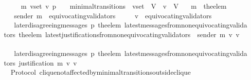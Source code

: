 \begin{isabellebody}
\ \ {\isachardoublequoteopen}{\isasymforall}\ {\isasymsigma}\ {\isasymsigma}{\isacharprime}\ m{\isacharprime}\ v{\isacharunderscore}set\ v\ p{\isachardot}\ {\isacharparenleft}{\isasymsigma}{\isacharcomma}\ {\isasymsigma}{\isacharprime}{\isacharparenright}\ {\isasymin}\ minimal{\isacharunderscore}transitions\ {\isasymand}\ v{\isacharunderscore}set\ {\isasymsubseteq}\ V\ {\isasymand}\ v\ {\isasymin}\ V\isanewline
\ \ {\isasymlongrightarrow}\ m{\isacharprime}\ {\isacharequal}\ the{\isacharunderscore}elem\ {\isacharparenleft}{\isasymsigma}{\isacharprime}\ {\isacharminus}\ {\isasymsigma}{\isacharparenright}\isanewline
\ \ {\isasymlongrightarrow}\ sender\ m{\isacharprime}\ {\isasymnotin}\ equivocating{\isacharunderscore}validators\ {\isasymsigma}{\isacharprime}\ \isanewline
\ \ {\isasymlongrightarrow}\ v\ {\isasymnotin}\ equivocating{\isacharunderscore}validators\ {\isasymsigma}\isanewline
\ \ {\isasymlongrightarrow}\ later{\isacharunderscore}disagreeing{\isacharunderscore}messages\ {\isacharparenleft}p{\isacharcomma}\ {\isacharparenleft}the{\isacharunderscore}elem\ {\isacharparenleft}latest{\isacharunderscore}messages{\isacharunderscore}from{\isacharunderscore}non{\isacharunderscore}equivocating{\isacharunderscore}validators\ {\isacharparenleft}the{\isacharunderscore}elem\ {\isacharparenleft}latest{\isacharunderscore}justifications{\isacharunderscore}from{\isacharunderscore}non{\isacharunderscore}equivocating{\isacharunderscore}validators\ {\isasymsigma}\ {\isacharparenleft}sender\ m{\isacharprime}{\isacharparenright}{\isacharparenright}{\isacharparenright}\ v{\isacharparenright}{\isacharparenright}{\isacharcomma}\ v{\isacharcomma}\ {\isasymsigma}{\isacharparenright}\ {\isacharequal}\ {\isasymemptyset}\isanewline
\ \ {\isasymlongrightarrow}\ later{\isacharunderscore}disagreeing{\isacharunderscore}messages\ {\isacharparenleft}p{\isacharcomma}\ {\isacharparenleft}the{\isacharunderscore}elem\ {\isacharparenleft}latest{\isacharunderscore}messages{\isacharunderscore}from{\isacharunderscore}non{\isacharunderscore}equivocating{\isacharunderscore}validators\ {\isacharparenleft}justification\ m{\isacharprime}{\isacharparenright}\ v{\isacharparenright}{\isacharparenright}{\isacharcomma}\ v{\isacharcomma}\ {\isasymsigma}{\isacharparenright}\ {\isacharequal}\ {\isasymemptyset}{\isachardoublequoteclose}\isanewline
%
\isadelimproof
\ \ %
\endisadelimproof
%
\isatagproof
{}\isamarkupfalse%
%
\endisatagproof
{\isafoldproof}%
%
\isadelimproof
\isanewline
%
\endisadelimproof
\isanewline
\isanewline
{}\isamarkupfalse%
\ {\isacharparenleft}\ Protocol{\isacharparenright}\ clique{\isacharunderscore}not{\isacharunderscore}affected{\isacharunderscore}by{\isacharunderscore}minimal{\isacharunderscore}transitions{\isacharunderscore}outside{\isacharunderscore}clique\ {\isacharcolon}\isanewline

\end{isabellebody}
